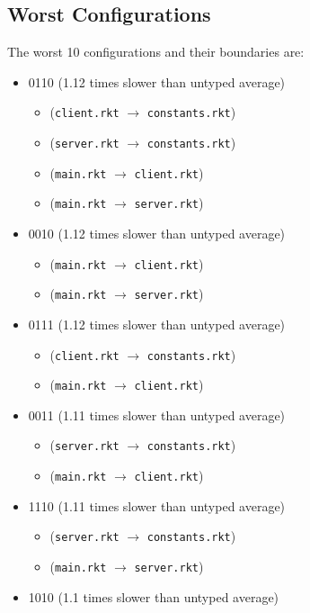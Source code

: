 \documentclass{article}
\newcommand{\mono}[1]{\texttt{#1}}
\begin{document}
\subsection{Worst Configurations}
The worst 10 configurations and their boundaries are:
\begin{itemize}
\item 0110 (1.12 times slower than untyped average)
  \begin{itemize}
  \item (\mono{client.rkt} $\rightarrow$ \mono{constants.rkt})
  \item (\mono{server.rkt} $\rightarrow$ \mono{constants.rkt})
  \item (\mono{main.rkt} $\rightarrow$ \mono{client.rkt})
  \item (\mono{main.rkt} $\rightarrow$ \mono{server.rkt})
  \end{itemize}
\item 0010 (1.12 times slower than untyped average)
  \begin{itemize}
  \item (\mono{main.rkt} $\rightarrow$ \mono{client.rkt})
  \item (\mono{main.rkt} $\rightarrow$ \mono{server.rkt})
  \end{itemize}
\item 0111 (1.12 times slower than untyped average)
  \begin{itemize}
  \item (\mono{client.rkt} $\rightarrow$ \mono{constants.rkt})
  \item (\mono{main.rkt} $\rightarrow$ \mono{client.rkt})
  \end{itemize}
\item 0011 (1.11 times slower than untyped average)
  \begin{itemize}
  \item (\mono{server.rkt} $\rightarrow$ \mono{constants.rkt})
  \item (\mono{main.rkt} $\rightarrow$ \mono{client.rkt})
  \end{itemize}
\item 1110 (1.11 times slower than untyped average)
  \begin{itemize}
  \item (\mono{server.rkt} $\rightarrow$ \mono{constants.rkt})
  \item (\mono{main.rkt} $\rightarrow$ \mono{server.rkt})
  \end{itemize}
\item 1010 (1.1 times slower than untyped average)

\end{itemize}
\end{document}
